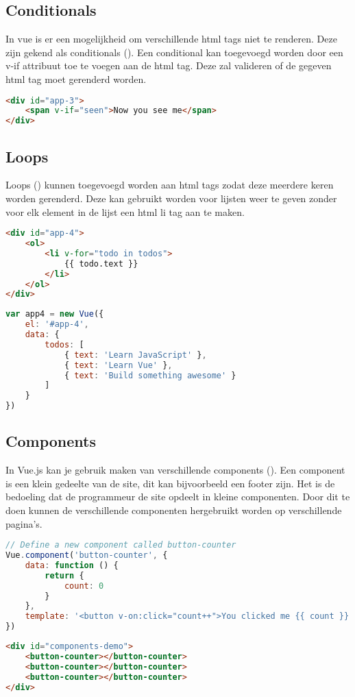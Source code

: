 \subsection{Conditionals}
In vue is er een mogelijkheid om verschillende html tags niet te renderen. Deze zijn gekend als conditionals (\cite{VUE_CONDITIONALSANDLOOPS}). Een conditional kan toegevoegd worden door een v-if attribuut toe te voegen aan de html tag. Deze zal valideren of de gegeven html tag moet gerenderd worden. 

\begin{lstlisting}[caption=Conditionals html, language=HTML]
<div id="app-3">
	<span v-if="seen">Now you see me</span>
</div>
\end{lstlisting}


\subsection{Loops}
Loops (\cite{VUE_CONDITIONALSANDLOOPS}) kunnen toegevoegd worden aan html tags zodat deze meerdere keren worden gerenderd. Deze kan gebruikt worden voor lijsten weer te geven zonder voor elk element in de lijst een html li tag aan te maken.

\begin{lstlisting}[caption=Loops html, language=HTML]
<div id="app-4">
	<ol>
		<li v-for="todo in todos">
			{{ todo.text }}
		</li>
	</ol>
</div>
\end{lstlisting}

\begin{lstlisting}[caption=Loops javascript, language=Javascript]
var app4 = new Vue({
	el: '#app-4',
	data: {
		todos: [
			{ text: 'Learn JavaScript' },
			{ text: 'Learn Vue' },
			{ text: 'Build something awesome' }
		]
	}
})
\end{lstlisting}


\subsection{Components}
In Vue.js kan je gebruik maken van verschillende components (\cite{VUE_COMPONENTS}). Een component is een klein gedeelte van de site, dit kan bijvoorbeeld een footer zijn. Het is de bedoeling dat de programmeur de site opdeelt in kleine componenten. Door dit te doen kunnen de verschillende componenten hergebruikt worden op verschillende pagina’s.

\begin{lstlisting}[caption=Components javascript, language=Javascript]
// Define a new component called button-counter
Vue.component('button-counter', {
	data: function () {
		return {
			count: 0
		}
	},
	template: '<button v-on:click="count++">You clicked me {{ count }} times.</button>'
})
\end{lstlisting}

\begin{lstlisting}[caption=Components html, language=HTML]
<div id="components-demo">
	<button-counter></button-counter>
	<button-counter></button-counter>
	<button-counter></button-counter>
</div>
\end{lstlisting}